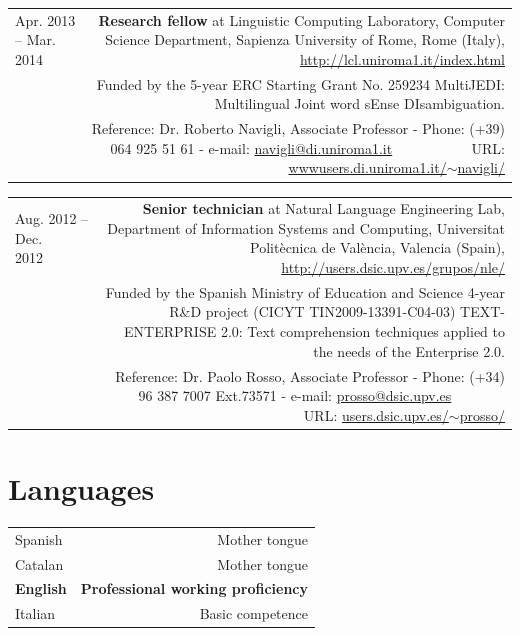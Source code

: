 \documentclass[10pt]{article}
\begin{document}
\begin{tabular}{L!{\VRule}R}
Apr. 2013 -- Mar. 2014 ~~&{\textbf{Research fellow} at Linguistic Computing Laboratory, Computer Science Department, Sapienza University of Rome, Rome (Italy), \url{http://lcl.uniroma1.it/index.html}}\\
&\scriptsize{Funded by the 5-year ERC Starting Grant No. 259234 MultiJEDI: Multilingual Joint word sEnse DIsambiguation.}\\
&\scriptsize{Reference: Dr. Roberto Navigli, Associate Professor - Phone: (+39) 064 925 51 61 - e-mail: \href{mailto:navigli@di.uniroma1.it}{navigli@di.uniroma1.it} ~~~~~~~~~~ URL: \href{http://wwwusers.di.uniroma1.it/~navigli/}{wwwusers.di.uniroma1.it/$\sim$navigli/}}\\
\end{tabular}

\begin{tabular}{L!{\VRule}R}
Aug. 2012 -- Dec. 2012~~~~&{\textbf{Senior technician} at Natural Language Engineering Lab, Department of Information Systems and Computing, Universitat Polit{\`e}cnica de 
Val{\`e}ncia, Valencia (Spain), \url{http://users.dsic.upv.es/grupos/nle/}}\\
&\scriptsize{Funded by the Spanish Ministry of Education and Science 4-year R\&D project (CICYT TIN2009-13391-C04-03) TEXT-ENTERPRISE 2.0: Text comprehension techniques
applied to the needs of the Enterprise 2.0.}\\
&\scriptsize{Reference: Dr. Paolo Rosso, Associate Professor - Phone: (+34) 96 387 7007 Ext.73571 - e-mail: \href{mailto:prosso@dsic.upv.es}{prosso@dsic.upv.es} ~~~~~~~ URL: \href{http://users.dsic.upv.es/~prosso/}{users.dsic.upv.es/$\sim$prosso/}}\\
\end{tabular}

\section*{Languages}
\begin{tabular}{L!{\VRule}R}
Spanish&Mother tongue\\
Catalan&Mother tongue\\
{\bf English}&{\bf Professional working proficiency}\\
Italian&Basic competence\\
\end{tabular}
\end{document}
